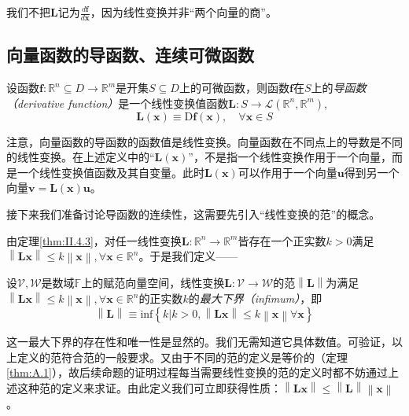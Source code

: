 \documentclass[../main.tex]{subfiles}
\begin{document}
我们不把$\mathbf{L}$记为$\frac{d\mathbf{f}}{d\mathbf{x}}$，因为线性变换并非“两个向量的商”。

\subsection{向量函数的导函数、连续可微函数}
\begin{definition}[向量函数的导函数]\label{def:II.4.15}
    设函数$\mathbf{f}:\mathbb{R}^n\subseteq D\rightarrow\mathbb{R}^m$是开集$S\subseteq D$上的可微函数，则函数$\mathbf{f}$在$S$上的\emph{导函数（derivative function）}是一个线性变换值函数$\mathbf{L}:S\rightarrow\mathcal{L}\left(\mathbb{R}^n,\mathbb{R}^m\right)$,
    \[\mathbf{L}\left(\mathbf{x}\right)\equiv \mathrm{D}\mathbf{f}\left(\mathbf{x}\right),\quad\forall\mathbf{x}\in S\]
\end{definition}

注意，向量函数的导函数的函数值是线性变换。向量函数在不同点上的导数是不同的线性变换。在上述定义中的“$\mathbf{L}\left(\mathbf{x}\right)$”，不是指一个线性变换作用于一个向量，而是一个线性变换值函数及其自变量。此时$\mathbf{L}\left(\mathbf{x}\right)$可以作用于一个向量$\mathbf{u}$得到另一个向量$\mathbf{v}=\mathbf{L}\left(\mathbf{x}\right)\mathbf{u}$。

接下来我们准备讨论导函数的连续性，这需要先引入“线性变换的范”的概念。

由定理\ref{thm:II.4.3}，对任一线性变换$\mathbf{L}:\mathbb{R}^n\rightarrow\mathbb{R}^m$皆存在一个正实数$k>0$满足$\left\|\mathbf{Lx}\right\|\leq k\left\|\mathbf{x}\right\|,\forall\mathbf{x}\in\mathbb{R}^n$。于是我们定义——
\begin{definition}[线性变换的范]\label{def:II.4.16}
    设$\mathcal{V},\mathcal{W}$是数域$\mathbb{F}$上的赋范向量空间，线性变换$\mathbf{L}:\mathcal{V}\rightarrow\mathcal{W}$的范$\left\|\mathbf{L}\right\|$为满足$\left\|\mathbf{Lx}\right\|\leq k\left\|\mathbf{x}\right\|,\forall\mathbf{x}\in\mathbb{R}^n$的正实数$k$的\emph{最大下界（infimum）}，即
    \[\left\|\mathbf{L}\right\|\equiv\mathrm{inf}\left\{k|k>0,\left\|\mathbf{Lx}\right\|\leq k\left\|\mathbf{x}\right\|\forall\mathbf{x}\right\}\]
\end{definition}

这一最大下界的存在性和唯一性是显然的。我们无需知道它具体数值。可验证，以上定义的范符合范的一般要求。又由于不同的范的定义是等价的（定理\ref{thm:A.1}），故后续命题的证明过程每当需要线性变换的范的定义时都不妨通过上述这种范的定义来求证。由此定义我们可立即获得性质：$\left\|\mathbf{Lx}\right\|\leq\left\|\mathbf{L}\right\|\left\|\mathbf{x}\right\|$。
\end{document}
